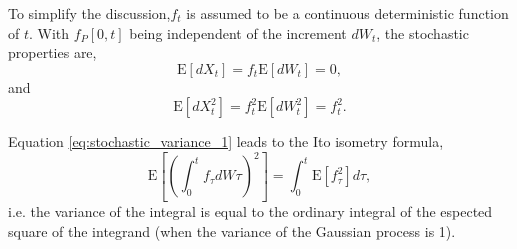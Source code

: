 \documentclass[letterpaper%
, twoside%
, 12pt%
,memoire%
, english%
,creativecommons,hyperref%
]{thETS}
\theoremstyle{newThmStyle}
\begin{document}
To simplify the discussion,$f_t$ is assumed to be a continuous deterministic function of $t$. With $f_P{[0,t]}$ being independent of the increment $dW_t$, the stochastic properties are, 
\begin{equation}
\text{E}[dX_t] = f_t\text{E}[dW_t] = 0,
\end{equation}
and
\begin{equation} \label{eq:stochastic_variance_1}
\text{E}[dX_t^2] = f_t^2\text{E}[dW_t^2]=f_t^2.
\end{equation}

Equation \ref{eq:stochastic_variance_1} leads to the Ito isometry formula, 
\begin{equation} \label{eq:ito_isometry}
\text{E}\left[\left( \int_0^t f_\tau dW\tau   \right)^2\right] = \int_0^t \text{E}\left[ f_\tau^2\right] d\tau ,
\end{equation}
i.e. the variance of the integral is equal to the ordinary integral of the espected square of the integrand (when the variance of the Gaussian process is 1). 
\end{document}
